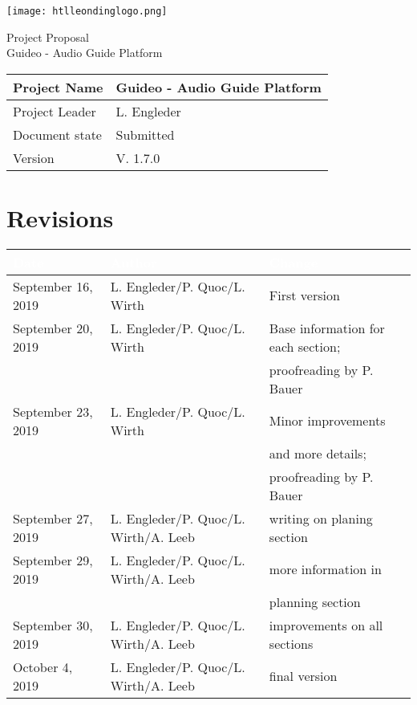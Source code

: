 \documentclass[12pt]{article}
\theoremstyle{definition}
\newcommand{\productname}{Guideo - Audio Guide Platform}
\newcommand{\projectleader}{L. Engleder}
\newcommand{\documentstatus}{Submitted}
\newcommand{\version}{V. 1.7.0}
\begin{document}
\begin{titlepage}
\begin{flushright}
\texttt{[image: htlleondinglogo.png]}\\
\end{flushright}
 
\vspace{10em}
 
\begin{center}
{\Huge Project Proposal} \\[3em]
{\LARGE \productname} \\[3em]
\end{center}
 
\begin{flushleft}
\begin{tabular}{|l|l|}
\hline
Project Name & \productname \\ \hline
Project Leader & \projectleader \\ \hline
Document state & \documentstatus \\ \hline
Version & \version \\ \hline
\end{tabular}
\end{flushleft}
 
\end{titlepage}
\section*{Revisions}
\begin{tabular}{|l|l|l|}
\hline
\cellcolor[gray]{0.5}\textcolor{white}{Date} & \cellcolor[gray]{0.5}\textcolor{white}{Author} & \cellcolor[gray]{0.5}\textcolor{white}{Change} \\ \hline
September 16, 2019&L. Engleder/P. Quoc/L. Wirth&First version \\ \hline
September 20, 2019&L. Engleder/P. Quoc/L. Wirth& Base information for each section; \\ && proofreading by P. Bauer \\ \hline
September 23, 2019&L. Engleder/P. Quoc/L. Wirth&Minor improvements \\ && and more details;  \\ && proofreading by P. Bauer \\ \hline
September 27, 2019&L. Engleder/P. Quoc/L. Wirth/A. Leeb&writing on planing section \\ \hline
September 29, 2019&L. Engleder/P. Quoc/L. Wirth/A. Leeb&more information in \\ && planning section \\ \hline
September 30, 2019&L. Engleder/P. Quoc/L. Wirth/A. Leeb& improvements on all sections \\ \hline
October 4, 2019&L. Engleder/P. Quoc/L. Wirth/A. Leeb&final version\\ \hline
\end{tabular}
\pagebreak
 
\end{document}
